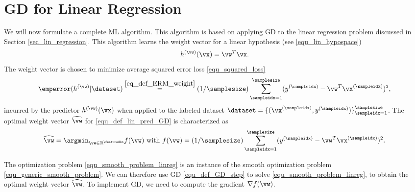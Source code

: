 \documentclass[12pt]{report}
\begin{document}
\section{GD for Linear Regression} 
\label{sec_lin_reg}

We will now formulate a complete ML algorithm. This algorithm is based on 
applying GD to the linear regression problem discussed in Section \ref{sec_lin_regression}. 
This algorithm learns the weight vector 
for a linear hypothesis (see \eqref{equ_lin_hypospace}) 
\begin{equation} 
\label{equ_def_lin_pred_GD}
h^{(\vw)}(\vx) = \vw^{T} \vx.
\end{equation}
The weight vector is chosen to minimize average 
squared error loss \eqref{equ_squared_loss}
\begin{equation} 
\label{equ_def_cost_linreg}
\emperror(h^{(\vw)}| \dataset) \stackrel{\eqref{eq_def_ERM_weight}}{=} (1/\samplesize) \sum_{\sampleidx=1}^{\samplesize} (y^{(\sampleidx)} - \vw^{T} \vx^{(\sampleidx)})^{2}, 
\end{equation}
incurred by the predictor $h^{(\vw)}(\vx)$ when applied to 
the labeled dataset $\dataset=\{ (\vx^{(\sampleidx)}, y^{(\sampleidx)}) \}_{\sampleidx=1}^{\samplesize}$. 
The optimal weight vector $\widehat{\vw}$ for \eqref{equ_def_lin_pred_GD} is 
characterized as
\begin{equation} 
\label{equ_smooth_problem_linreg}
\widehat{\vw} = \argmin_{\vw \in \mathbb{R}^{\featuredim}} f(\vw) \mbox{ with } f(\vw) = (1/\samplesize) \sum_{\sampleidx=1}^{\samplesize} (y^{(\sampleidx)} - \vw^{T} \vx^{(\sampleidx)})^{2}. 
\end{equation} 

The optimization problem \eqref{equ_smooth_problem_linreg} is an instance of the smooth 
optimization problem \eqref{equ_generic_smooth_problem}.  
We can therefore use GD \eqref{equ_def_GD_step} to solve \eqref{equ_smooth_problem_linreg}, 
to obtain the optimal weight vector $\widehat{\vw}$. To implement GD, we need to compute 
the gradient $\nabla f(\vw)$. 
\end{document}
